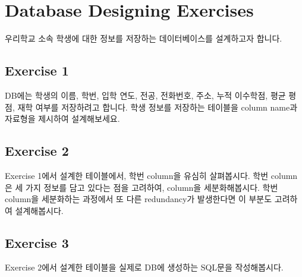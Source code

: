 \section{Database Designing Exercises}\label{sect:database-designing-exercises}

우리학교 소속 학생에 대한 정보를 저장하는 데이터베이스를 설계하고자 합니다.

\subsection*{Exercise 1}
DB에는 학생의 이름, 학번, 입학 연도, 전공, 전화번호, 주소, 누적 이수학점, 평균 평점, 재학 여부를 저장하려고 합니다. 학생 정보를 저장하는 테이블을 column name과 자료형을 제시하여 설계해보세요.

\subsection*{Exercise 2}
Exercise 1에서 설계한 테이블에서, 학번 column을 유심히 살펴봅시다. 학번 column은 세 가지 정보를 담고 있다는 점을 고려하여, column을 세분화해봅시다. 학번 column을 세분화하는 과정에서 또 다른 redundancy가 발생한다면 이 부분도 고려하여 설계해봅시다.

\subsection*{Exercise 3}
Exercise 2에서 설계한 테이블을 실제로 DB에 생성하는 SQL문을 작성해봅시다.

